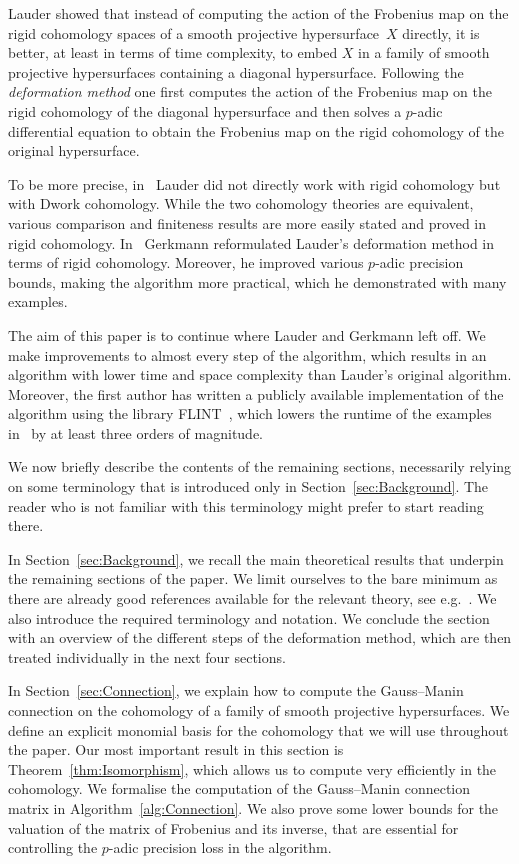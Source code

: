 \documentclass[a4paper,11pt]{article}
\numberwithin{equation}{section}
\theoremstyle{definition}
\begin{document}
Lauder \citep{Lauder2004a,Lauder2004b} showed that instead of computing the 
action of the Frobenius map on the rigid cohomology spaces of a smooth 
projective hypersurface~$X$ directly, it is better, at least in terms of 
time complexity, to embed $X$ in a family of smooth projective hypersurfaces 
containing a diagonal hypersurface.  Following the \emph{deformation method} 
one first computes the action of the Frobenius map on the rigid cohomology 
of the diagonal hypersurface and then solves a $p$-adic differential equation 
to obtain the Frobenius map on the rigid cohomology of the original 
hypersurface. 

To be more precise, in~\citep{Lauder2004a,Lauder2004b} Lauder did not directly 
work with rigid cohomology but with Dwork cohomology. While the two 
cohomology theories are equivalent, various comparison and finiteness results 
are more easily stated and proved in rigid cohomology.  In~\citep{Gerkmann2007} 
Gerkmann reformulated Lauder's deformation method in terms of rigid 
cohomology.  Moreover, he improved various $p$-adic precision bounds, making 
the algorithm more practical, which he demonstrated with many examples.

The aim of this paper is to continue where Lauder and Gerkmann left off. 
We make improvements to almost every step of the algorithm, which results in 
an algorithm with lower time and space complexity than Lauder's original 
algorithm. Moreover, the first author has written a publicly available 
implementation of the algorithm using the library FLINT~\citep{FLINT}, which  
lowers the runtime of the examples in~\citep{Gerkmann2007} by at least three 
orders of magnitude.

We now briefly describe the contents of the remaining sections,
necessarily relying on some terminology that is introduced only 
in Section~\ref{sec:Background}.  The reader who is not familiar 
with this terminology might prefer to start reading there.

In Section~\ref{sec:Background}, we recall the main theoretical results that 
underpin the remaining sections of the paper.  We limit ourselves to the bare 
minimum as there are already good references available for the relevant theory, 
see e.g.~\citep{Kedlaya2012}. We also introduce the required terminology and 
notation. We conclude the section with an overview of the different steps of 
the deformation method, which are then treated individually in the next four 
sections.

In Section~\ref{sec:Connection}, we explain how to compute the Gauss--Manin 
connection on the cohomology of a family of smooth projective hypersurfaces. 
We define an explicit monomial basis for the cohomology that we will use 
throughout the paper. Our most important result in this section
is Theorem~\ref{thm:Isomorphism}, which allows us to compute very efficiently 
in the cohomology. We formalise the computation of the Gauss--Manin connection 
matrix in Algorithm~\ref{alg:Connection}. We also prove some lower bounds for 
the valuation of the matrix of Frobenius and its inverse, that are essential 
for controlling the $p$-adic precision loss in the algorithm.
\end{document}

